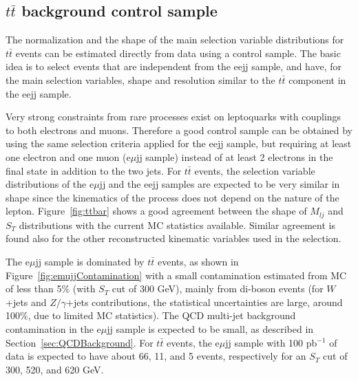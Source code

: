 \subsection{$t\bar{t}$ background control sample} \label{sec:ttbarControlSample}

The normalization and the shape of the main selection variable distributions for 
$t\bar{t}$ events can be estimated directly from data using a control sample. 
The basic idea is to select events that are independent from the eejj sample, and have, for the main selection variables, 
shape and resolution similar to the $t\bar{t}$ component in the eejj sample.

Very strong constraints from rare processes exist on leptoquarks with
couplings to both electrons and muons.
Therefore a good control sample can be obtained by using the same selection criteria applied for the eejj sample, but 
requiring at least one electron and one muon (e$\mu$jj sample) instead of at least 2 electrons 
in the final state in addition to the two jets. 
For $t\bar{t}$ events, the selection variable distributions of the e$\mu$jj and the eejj samples
are expected to be very similar in shape since the kinematics of the process does not depend 
on the nature of the lepton. Figure~\ref{fig:ttbar} shows a good agreement between 
the shape of $M_{lj}$ and $S_{T}$ distributions with the current MC statistics available. Similar agreement 
is found also for the other reconstructed kinematic variables used in the selection. 

The e$\mu$jj sample is dominated by $t\bar{t}$ events, as shown in Figure~\ref{fig:emujjContamination} 
with a small contamination estimated from MC of less than 5\% (with $S_{T}$ cut of 300 GeV), 
mainly from di-boson events (for $W$+jets and $Z/\gamma$+jets contributions, the statistical 
uncertainties are large, around 100\%, due to limited MC statistics). 
The QCD multi-jet background contamination in the e$\mu$jj sample is expected to be small, as described 
in Section~\ref{sec:QCDBackground}. 
For $t\bar{t}$ events, the e$\mu$jj sample with 100 pb$^{-1}$ of data 
is expected to have about 66, 11, and 5 events, respectively for an $S_{T}$ cut of 300, 520, and 620 GeV.


